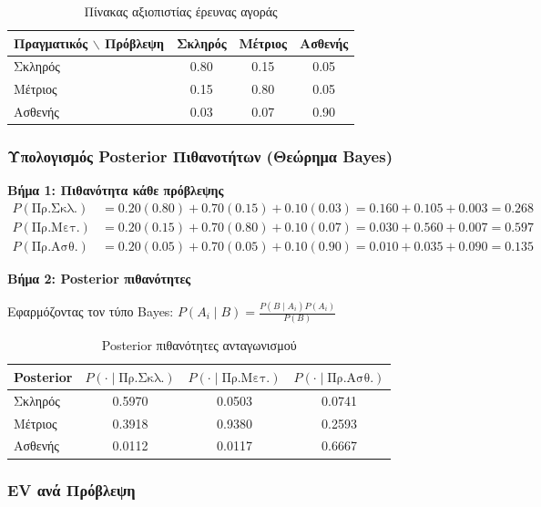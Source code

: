 \documentclass[a4paper,12pt]{article}
\begin{document}
\begin{table}[H]
\centering
\begin{tabular}{l|ccc}
\toprule
\textbf{Πραγματικός} $\backslash$ \textbf{Πρόβλεψη} & Σκληρός & Μέτριος & Ασθενής \\
\midrule
Σκληρός & 0.80 & 0.15 & 0.05 \\
Μέτριος & 0.15 & 0.80 & 0.05 \\
Ασθενής & 0.03 & 0.07 & 0.90 \\
\bottomrule
\end{tabular}
\caption{Πίνακας αξιοπιστίας έρευνας αγοράς}
\end{table}

\subsubsection{Υπολογισμός Posterior Πιθανοτήτων (Θεώρημα Bayes)}

\textbf{Βήμα 1: Πιθανότητα κάθε πρόβλεψης}
\begin{align}
P(\text{Πρ.Σκλ.}) &= 0.20(0.80) + 0.70(0.15) + 0.10(0.03) = 0.160 + 0.105 + 0.003 = 0.268 \\
P(\text{Πρ.Μετ.}) &= 0.20(0.15) + 0.70(0.80) + 0.10(0.07) = 0.030 + 0.560 + 0.007 = 0.597 \\
P(\text{Πρ.Ασθ.}) &= 0.20(0.05) + 0.70(0.05) + 0.10(0.90) = 0.010 + 0.035 + 0.090 = 0.135
\end{align}

\textbf{Βήμα 2: Posterior πιθανότητες}

Εφαρμόζοντας τον τύπο Bayes: $P(A_i \mid B) = \frac{P(B \mid A_i) P(A_i)}{P(B)}$

\begin{table}[H]
\centering
\begin{tabular}{l|ccc}
\toprule
\textbf{Posterior} & $P(\cdot \mid \text{Πρ.Σκλ.})$ & $P(\cdot \mid \text{Πρ.Μετ.})$ & $P(\cdot \mid \text{Πρ.Ασθ.})$ \\
\midrule
Σκληρός & 0.5970 & 0.0503 & 0.0741 \\
Μέτριος & 0.3918 & 0.9380 & 0.2593 \\
Ασθενής & 0.0112 & 0.0117 & 0.6667 \\
\bottomrule
\end{tabular}
\caption{Posterior πιθανότητες ανταγωνισμού}
\end{table}

\subsubsection{EV ανά Πρόβλεψη}
\end{document}
